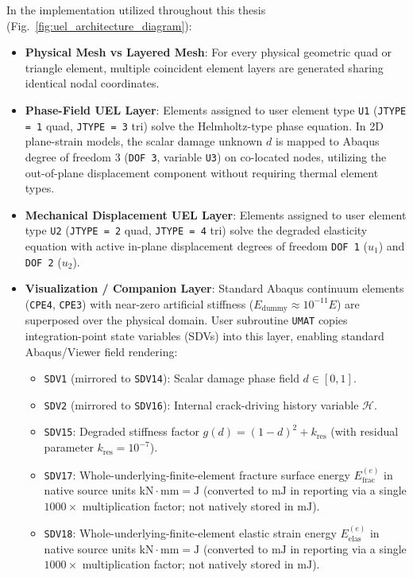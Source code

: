 In the implementation utilized throughout this thesis (Fig.~\ref{fig:uel_architecture_diagram}):
\begin{itemize}
    \item \textbf{Physical Mesh vs Layered Mesh}: For every physical geometric quad or triangle element, multiple coincident element layers are generated sharing identical nodal coordinates.
    \item \textbf{Phase-Field UEL Layer}: Elements assigned to user element type \texttt{U1} (\texttt{JTYPE = 1} quad, \texttt{JTYPE = 3} tri) solve the Helmholtz-type phase equation. In 2D plane-strain models, the scalar damage unknown $d$ is mapped to Abaqus degree of freedom 3 (\texttt{DOF 3}, variable \texttt{U3}) on co-located nodes, utilizing the out-of-plane displacement component without requiring thermal element types.
    \item \textbf{Mechanical Displacement UEL Layer}: Elements assigned to user element type \texttt{U2} (\texttt{JTYPE = 2} quad, \texttt{JTYPE = 4} tri) solve the degraded elasticity equation with active in-plane displacement degrees of freedom \texttt{DOF 1} ($u_1$) and \texttt{DOF 2} ($u_2$).
    \item \textbf{Visualization / Companion Layer}: Standard Abaqus continuum elements (\texttt{CPE4}, \texttt{CPE3}) with near-zero artificial stiffness ($E_{\mathrm{dummy}} \approx 10^{-11} E$) are superposed over the physical domain. User subroutine \texttt{UMAT} copies integration-point state variables (SDVs) into this layer, enabling standard Abaqus/Viewer field rendering:
    \begin{itemize}
        \item \texttt{SDV1} (mirrored to \texttt{SDV14}): Scalar damage phase field $d \in [0, 1]$.
        \item \texttt{SDV2} (mirrored to \texttt{SDV16}): Internal crack-driving history variable $\mathcal{H}$.
        \item \texttt{SDV15}: Degraded stiffness factor $g(d) = (1-d)^2 + k_{\mathrm{res}}$ (with residual parameter $k_{\mathrm{res}} = 10^{-7}$).
        \item \texttt{SDV17}: Whole-underlying-finite-element fracture surface energy $E_{\mathrm{frac}}^{(e)}$ in native source units $\mathrm{kN\cdot mm} = \mathrm{J}$ (converted to $\mathrm{mJ}$ in reporting via a single $1000\times$ multiplication factor; not natively stored in $\mathrm{mJ}$).
        \item \texttt{SDV18}: Whole-underlying-finite-element elastic strain energy $E_{\mathrm{elas}}^{(e)}$ in native source units $\mathrm{kN\cdot mm} = \mathrm{J}$ (converted to $\mathrm{mJ}$ in reporting via a single $1000\times$ multiplication factor; not natively stored in $\mathrm{mJ}$).

\end{itemize}
\end{itemize}
